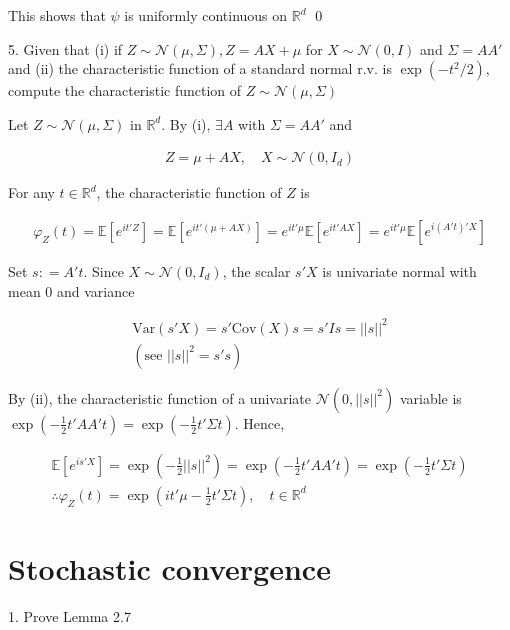 \documentclass[10pt]{article}
\begin{document}
This shows that $\psi$ is uniformly continuous on $\mathbb{R}^d$ \qed

\newpage

5. Given that (i) if $Z \sim  \mathcal{N}(\mu, \Sigma), Z = AX + \mu$ for $X \sim \mathcal{N}(0, I)$ and $\Sigma = AA'$ and (ii) 
the characteristic function of a standard normal r.v. is $\exp(-t^2/2)$, compute the characteristic function of $Z \sim  \mathcal{N}(\mu, \Sigma)$

Let $Z \sim \mathcal{N}(\mu, \Sigma)$ in $\mathbb{R}^d$. By (i), $\exists A$ with $\Sigma = AA'$ and 

\begin{gather*}
    Z = \mu + AX, \quad X \sim \mathcal{N}(0, I_d)
\end{gather*}

For any $t \in \mathbb{R}^d$, the characteristic function of $Z$ is 

\begin{gather*}
    \varphi_Z(t) = \mathbb{E}[e^{it'Z}] = \mathbb{E}[e^{it'(\mu + AX)}] = e^{it'\mu}\mathbb{E}[e^{it'AX}] = e^{it'\mu}\mathbb{E}[e^{i(A't)'X}]
\end{gather*}

Set $s: = A't$. Since $X \sim \mathcal{N}(0, I_d)$, the scalar $s'X$ is univariate normal with mean 0 and variance 

\begin{gather*}
    \text{Var}(s'X) = s' \text{Cov}(X)s = s'Is = ||s||^2 \\
    (\text{see }||s||^2 = s's)
\end{gather*}

By (ii), the characteristic function of a univariate $\mathcal{N}(0, ||s||^2)$ variable is $\exp(- \frac{1}{2}t'AA't) = \exp(-\frac{1}{2}t'\Sigma t)$. Hence, 

\begin{gather*}
    \mathbb{E}[e^{is'X}] = \exp (- \frac{1}{2}||s||^2) = \exp(- \frac{1}{2}t'AA't) = \exp (- \frac{1}{2}t'\Sigma t)\\
    \therefore \varphi_Z(t) = \exp(it'\mu - \frac{1}{2}t'\Sigma t), \quad t \in \mathbb{R}^d
\end{gather*}

\newpage

\section{Stochastic convergence}

1. Prove Lemma 2.7
\end{document}
